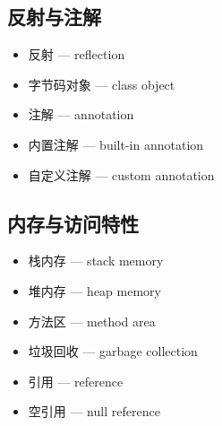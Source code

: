 \subsection{反射与注解}
\begin{itemize}
\item 反射 — reflection
\item 字节码对象 — class object
\item 注解 — annotation
\item 内置注解 — built-in annotation
\item 自定义注解 — custom annotation
\end{itemize}

\subsection{内存与访问特性}
\begin{itemize}
\item 栈内存 — stack memory
\item 堆内存 — heap memory
\item 方法区 — method area
\item 垃圾回收 — garbage collection
\item 引用 — reference
\item 空引用 — null reference
\end{itemize}
